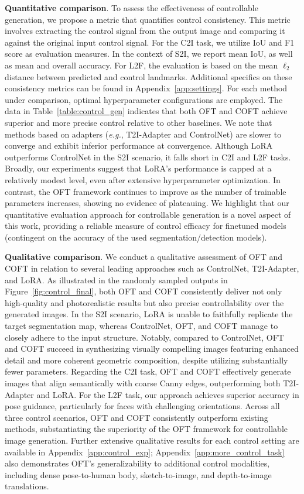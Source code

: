 {\textbf{Quantitative comparison}. To assess the effectiveness of controllable generation, we propose a metric that quantifies control consistency. This metric involves extracting the control signal from the output image and comparing it against the original input control signal. For the C2I task, we utilize IoU and F1 score as evaluation measures. In the context of S2I, we report mean IoU, as well as mean and overall accuracy. For L2F, the evaluation is based on the mean $\ell_2$ distance between predicted and control landmarks. Additional specifics on these consistency metrics can be found in Appendix~\ref{app:settings}. For each method under comparison, optimal hyperparameter configurations are employed. The data in Table~\ref{table:control_gen} indicates that both OFT and COFT achieve superior and more precise control relative to other baselines. We note that methods based on adapters (\emph{e.g.}, T2I-Adapter and ControlNet) are slower to converge and exhibit inferior performance at convergence. Although LoRA outperforms ControlNet in the S2I scenario, it falls short in C2I and L2F tasks. Broadly, our experiments suggest that LoRA’s performance is capped at a relatively modest level, even after extensive hyperparameter optimization. In contrast, the OFT framework continues to improve as the number of trainable parameters increases, showing no evidence of plateauing. We highlight that our quantitative evaluation approach for controllable generation is a novel aspect of this work, providing a reliable measure of control efficacy for finetuned models (contingent on the accuracy of the used segmentation/detection models).

\textbf{Qualitative comparison}. We conduct a qualitative assessment of OFT and COFT in relation to several leading approaches such as ControlNet, T2I-Adapter, and LoRA. As illustrated in the randomly sampled outputs in Figure~\ref{fig:control_final}, both OFT and COFT consistently deliver not only high-quality and photorealistic results but also precise controllability over the generated images. In the S2I scenario, LoRA is unable to faithfully replicate the target segmentation map, whereas ControlNet, OFT, and COFT manage to closely adhere to the input structure. Notably, compared to ControlNet, OFT and COFT succeed in synthesizing visually compelling images featuring enhanced detail and more coherent geometric composition, despite utilizing substantially fewer parameters. Regarding the C2I task, OFT and COFT effectively generate images that align semantically with coarse Canny edges, outperforming both T2I-Adapter and LoRA. For the L2F task, our approach achieves superior accuracy in pose guidance, particularly for faces with challenging orientations. Across all three control scenarios, OFT and COFT consistently outperform existing methods, substantiating the superiority of the OFT framework for controllable image generation. Further extensive qualitative results for each control setting are available in Appendix~\ref{app:control_exp}; Appendix~\ref{app:more_control_task} also demonstrates OFT’s generalizability to additional control modalities, including dense pose-to-human body, sketch-to-image, and depth-to-image translations.

}
